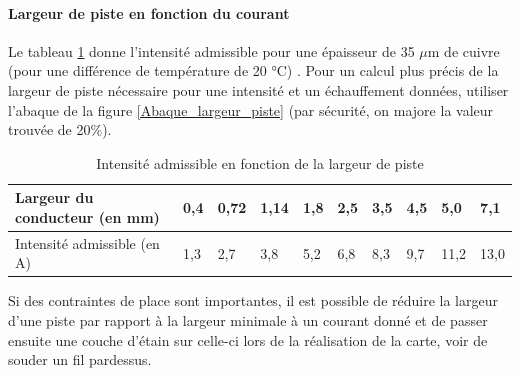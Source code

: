 \documentclass[a4paper]{article}
\begin{document}
\paragraph{Largeur de piste en fonction du courant}

Le tableau \ref{Intensite_admissible_fonction_largeur_piste} donne l'intensité admissible pour une épaisseur de 35 $\mu$m de cuivre (pour une différence de température de 20 °C) \cite{FAQ_CIF}. Pour un calcul plus précis de la largeur de piste nécessaire pour une intensité et un échauffement données, utiliser l'abaque de la figure \ref{Abaque_largeur_piste} (par sécurité, on majore la valeur trouvée de 20\%).

\begin{table}[H]
	\centering
	\begin{tabular}{|l||l|l|l|l|l|l|l|l|l|}\hline
			Largeur du conducteur (en mm) & 0,4 & 0,72 & 1,14 & 1,8 & 2,5 & 3,5 & 4,5 & 5,0 & 7,1\\\hline
			Intensité admissible (en A) & 1,3 & 2,7 & 3,8 & 5,2 & 6,8 & 8,3 & 9,7 & 11,2 & 13,0\\\hline
	\end{tabular}
	\caption{Intensité admissible en fonction de la largeur de piste
		\label{Intensite_admissible_fonction_largeur_piste}}
\end{table}

Si des contraintes de place sont importantes, il est possible de réduire la largeur d'une piste par rapport à la largeur minimale à un courant donné et de passer ensuite une couche d'étain sur celle-ci lors de la réalisation de la carte, voir de souder un fil pardessus.
\end{document}
